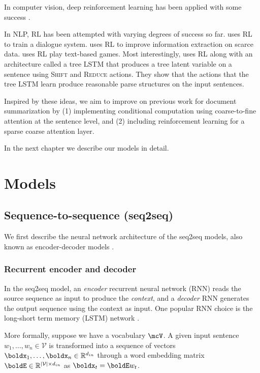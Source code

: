 \documentclass[11pt]{report}
\begin{document}
In computer vision, deep reinforcement learning has been applied with some success 
\citep{mnih2014visualattention, ba2015visualattention, xu2015captioning}.

In NLP, RL has been attempted with varying degrees of success so far.
\citet{ranzato2015} 
\citet{li2016dialogueRL} uses RL to train a dialogue system.
\citet{narasimhan2016} uses RL to improve information extraction on scarce data.
\citet{Narasimhan2015} uses RL play text-based games.
Most interestingly, \citet{Yogatama2017} uses RL along with an architecture called a tree LSTM that produces a tree latent variable on a sentence using \textsc{Shift} and \textsc{Reduce} actions. They show that the actions that the tree LSTM learn produce reasonable parse structures on the input sentences.


Inspired by these ideas, we aim to improve on previous work for document summarization by (1) implementing conditional computation using coarse-to-fine attention at the sentence level, and (2) including reinforcement learning for a sparse coarse attention layer.

In the next chapter we describe our models in detail.



\chapter{Models}

\section{Sequence-to-sequence (seq2seq)}

We first describe the neural network architecture of the seq2seq models, also known as encoder-decoder models \citep{bahdanau2014neural}.

\subsection{Recurrent encoder and decoder}

In the seq2seq model, an \emph{encoder} recurrent neural network (RNN) reads the source sequence as input to produce the \emph{context}, and a \emph{decoder} RNN generates the output sequence using the context as input.  One popular RNN choice is the long-short term memory (LSTM) network \citep{hochreiter1997long}.

More formally, suppose we have a vocabulary $\mcV$. A given input sentence $w_1, \ldots, w_n \in \mathcal{V}$ is transformed into a sequence of vectors $\boldx_1, \ldots, \boldx_n \in \mathbb{R}^{d_{in}}$ through a word embedding matrix $\boldE \in \mathbb{R}^{|\mathcal{V}| \times d_{in}}$ as $\boldx_t = \boldE w_t$.
\end{document}
